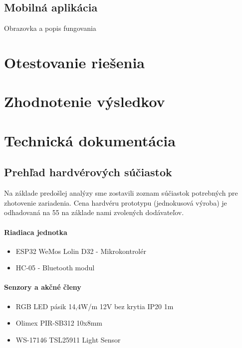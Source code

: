 \documentclass[12pt, a4paper]{article}
\begin{document}

\subsection{Mobilná aplikácia}
Obrazovka a popis fungovania

\section{Otestovanie riešenia}


\section{Zhodnotenie výsledkov}

\printbibliography[title={Literatúra}]
\newpage

\section{Technická dokumentácia}
\subsection{Prehľad hardvérových súčiastok}
Na základe predošlej analýzy sme zostavili zoznam súčiastok potrebných pre zhotovenie zariadenia. Cena hardvéru prototypu (jednokusová výroba) je odhadovaná na 55 \texteuro na základe nami zvolených dodávateľov.

\paragraph{Riadiaca jednotka}
\begin{itemize}
\itemsep0pt
\item ESP32 WeMos Lolin D32 - Mikrokontrolér
\item HC-05 - Bluetooth modul
\end{itemize}

\paragraph{Senzory a akčné členy}
\begin{itemize}
\itemsep0pt
\item RGB LED pásik 14,4W/m 12V bez krytia IP20 1m
\item Olimex PIR-SB312 10x8mm 
\item WS-17146 TSL25911 Light Sensor
\end{itemize}
\end{document}
